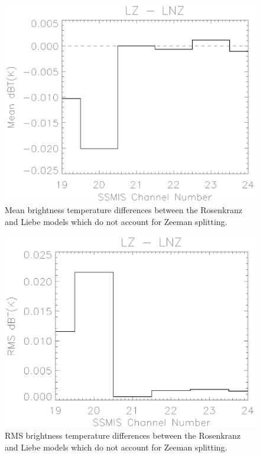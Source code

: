 \begin{figure}[htp]
  \centering{}
  \includegraphics[scale=0.8]{./graphics/Rosenkranz_V_Liebe.eps}
  \caption[below]{Mean brightness temperature differences between the Rosenkranz and Liebe models which do not account for Zeeman splitting.}
  \label{fig:Rosenkranz_V_Liebe}
\end{figure}

\begin{figure}[htp]
  \centering{}
  \includegraphics[scale=0.8]{./graphics/Rosenkranz_V_Liebe_RMS.eps}
  \caption[below]{RMS brightness temperature differences between the Rosenkranz and Liebe models which do not account for Zeeman splitting.}
  \label{fig:Rosenkranz_V_Liebe_RMS}
\end{figure}

